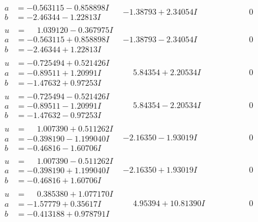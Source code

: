 \documentclass[1p]{elsarticle_modified}
\theoremstyle{definition}
\begin{document}
$$\begin{array}{c|c|c}
\begin{aligned}
a &= -0.563115 - 0.858898 I \\
b &= -2.46344 - 1.22813 I\end{aligned}
 & -1.38793 + 2.34054 I & \phantom{-0.000000 } 0 \\ \hline\begin{aligned}
u &= \phantom{-}1.039120 - 0.367975 I \\
a &= -0.563115 + 0.858898 I \\
b &= -2.46344 + 1.22813 I\end{aligned}
 & -1.38793 - 2.34054 I & \phantom{-0.000000 } 0 \\ \hline\begin{aligned}
u &= -0.725494 + 0.521426 I \\
a &= -0.89511 + 1.20991 I \\
b &= -1.47632 + 0.97253 I\end{aligned}
 & \phantom{-}5.84354 + 2.20534 I & \phantom{-0.000000 } 0 \\ \hline\begin{aligned}
u &= -0.725494 - 0.521426 I \\
a &= -0.89511 - 1.20991 I \\
b &= -1.47632 - 0.97253 I\end{aligned}
 & \phantom{-}5.84354 - 2.20534 I & \phantom{-0.000000 } 0 \\ \hline\begin{aligned}
u &= \phantom{-}1.007390 + 0.511262 I \\
a &= -0.398190 - 1.199040 I \\
b &= -0.46816 - 1.60706 I\end{aligned}
 & -2.16350 - 1.93019 I & \phantom{-0.000000 } 0 \\ \hline\begin{aligned}
u &= \phantom{-}1.007390 - 0.511262 I \\
a &= -0.398190 + 1.199040 I \\
b &= -0.46816 + 1.60706 I\end{aligned}
 & -2.16350 + 1.93019 I & \phantom{-0.000000 } 0 \\ \hline\begin{aligned}
u &= \phantom{-}0.385380 + 1.077170 I \\
a &= -1.57779 + 0.35617 I \\
b &= -0.413188 + 0.978791 I\end{aligned}
 & \phantom{-}4.95394 + 10.81390 I & \phantom{-0.000000 } 0 \\ \hline\begin{aligned}

\end{aligned}
\end{array}$$
\end{document}
